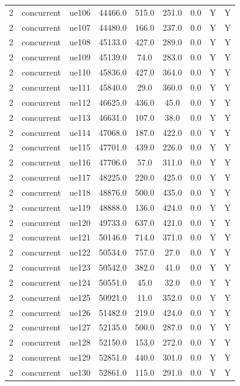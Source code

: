 \begin{table}[ht]
\begin{tabular}{|c|c|c|c|c|c|c|c|c|}
2 & concurrent & ue106 & 44466.0 & 515.0 & 251.0 & 0.0 & Y & Y \\
2 & concurrent & ue107 & 44480.0 & 166.0 & 237.0 & 0.0 & Y & Y \\
2 & concurrent & ue108 & 45133.0 & 427.0 & 289.0 & 0.0 & Y & Y \\
2 & concurrent & ue109 & 45139.0 & 74.0 & 283.0 & 0.0 & Y & Y \\
2 & concurrent & ue110 & 45836.0 & 427.0 & 364.0 & 0.0 & Y & Y \\
2 & concurrent & ue111 & 45840.0 & 29.0 & 360.0 & 0.0 & Y & Y \\
2 & concurrent & ue112 & 46625.0 & 436.0 & 45.0 & 0.0 & Y & Y \\
2 & concurrent & ue113 & 46631.0 & 107.0 & 38.0 & 0.0 & Y & Y \\
2 & concurrent & ue114 & 47068.0 & 187.0 & 422.0 & 0.0 & Y & Y \\
2 & concurrent & ue115 & 47701.0 & 439.0 & 226.0 & 0.0 & Y & Y \\
2 & concurrent & ue116 & 47706.0 & 57.0 & 311.0 & 0.0 & Y & Y \\
2 & concurrent & ue117 & 48225.0 & 220.0 & 425.0 & 0.0 & Y & Y \\
2 & concurrent & ue118 & 48876.0 & 500.0 & 435.0 & 0.0 & Y & Y \\
2 & concurrent & ue119 & 48888.0 & 136.0 & 424.0 & 0.0 & Y & Y \\
2 & concurrent & ue120 & 49733.0 & 637.0 & 421.0 & 0.0 & Y & Y \\
2 & concurrent & ue121 & 50146.0 & 714.0 & 371.0 & 0.0 & Y & Y \\
2 & concurrent & ue122 & 50534.0 & 757.0 & 27.0 & 0.0 & Y & Y \\
2 & concurrent & ue123 & 50542.0 & 382.0 & 41.0 & 0.0 & Y & Y \\
2 & concurrent & ue124 & 50551.0 & 45.0 & 32.0 & 0.0 & Y & Y \\
2 & concurrent & ue125 & 50921.0 & 11.0 & 352.0 & 0.0 & Y & Y \\
2 & concurrent & ue126 & 51482.0 & 219.0 & 424.0 & 0.0 & Y & Y \\
2 & concurrent & ue127 & 52135.0 & 500.0 & 287.0 & 0.0 & Y & Y \\
2 & concurrent & ue128 & 52150.0 & 153.0 & 272.0 & 0.0 & Y & Y \\
2 & concurrent & ue129 & 52851.0 & 440.0 & 301.0 & 0.0 & Y & Y \\
2 & concurrent & ue130 & 52861.0 & 115.0 & 291.0 & 0.0 & Y & Y \\

\end{tabular}
\end{table}
